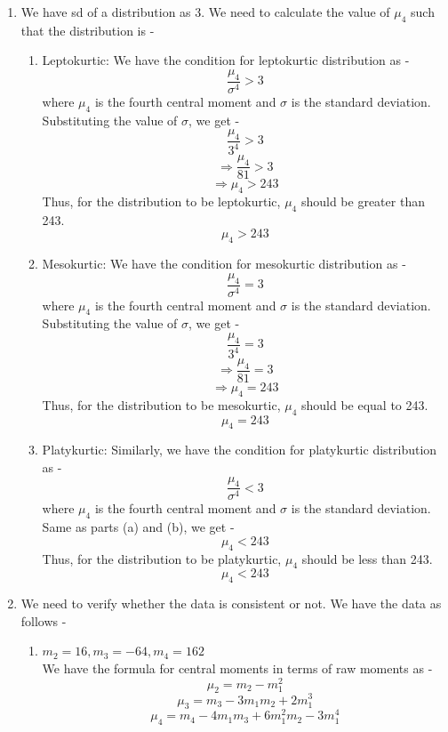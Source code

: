 \begin{enumerate}
    Thus, the coefficient of skewness is -0.9.
    \[\boxed{Sk = -0.9
    }\]
    \item We have sd of a distribution as 3. We need to calculate the value of $\mu_4$ such that the distribution is - 
    \begin{enumerate}
        \item Leptokurtic: 
        We have the condition for leptokurtic distribution as -
        \[\frac{\mu_4}{\sigma^4} > 3\]
        where $\mu_4$ is the fourth central moment and $\sigma$ is the standard deviation. \\
        Substituting the value of $\sigma$, we get -
        \[\frac{\mu_4}{3^4} > 3\]
        \[\Rightarrow \frac{\mu_4}{81} > 3\]
        \[\Rightarrow \mu_4 > 243\]
        Thus, for the distribution to be leptokurtic, $\mu_4$ should be greater than 243.
        \[\boxed{\mu_4 > 243
        }\]
        \item Mesokurtic:
        We have the condition for mesokurtic distribution as -
        \[\frac{\mu_4}{\sigma^4} = 3\]
        where $\mu_4$ is the fourth central moment and $\sigma$ is the standard deviation. \\
        Substituting the value of $\sigma$, we get -
        \[\frac{\mu_4}{3^4} = 3\]
        \[\Rightarrow \frac{\mu_4}{81} = 3\]
        \[\Rightarrow \mu_4 = 243\]
        Thus, for the distribution to be mesokurtic, $\mu_4$ should be equal to 243.
        \[\boxed{\mu_4 = 243
        }\]
        \item Platykurtic:
        Similarly, we have the condition for platykurtic distribution as -
        \[\frac{\mu_4}{\sigma^4} < 3\]
        where $\mu_4$ is the fourth central moment and $\sigma$ is the standard deviation. \\
        Same as parts (a) and (b), we get -
        \[\mu_4 < 243\]
        Thus, for the distribution to be platykurtic, $\mu_4$ should be less than 243.
        \[\boxed{\mu_4 < 243
        }\]
    \end{enumerate}
    \item We need to verify whether the data is consistent or not. We have the data as follows - 
    \begin{enumerate}
        \item $m_2 = 16, m_3 = -64, m_4 = 162$ \\
        We have the formula for central moments in terms of raw moments as -
        \[\mu_2 = m_2 - m_1^2\]
        \[\mu_3 = m_3 - 3m_1 m_2 + 2m_1^3\]
        \[\mu_4 = m_4 - 4m_1 m_3 + 6m_1^2 m_2 - 3m_1^4\]

\end{enumerate}
\end{enumerate}
